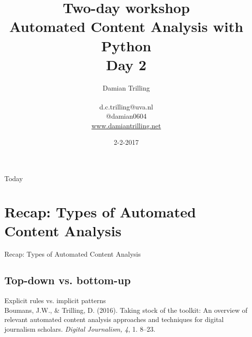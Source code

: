 \documentclass[handout]{beamer}
\begin{document}
\title[Automated Content Analysis with Python]{\textbf{Two-day workshop\\ Automated Content Analysis with Python} \\ Day 2}
\author[Damian Trilling]{Damian Trilling \\ ~ \\ \footnotesize{d.c.trilling@uva.nl \\@damian0604} \\ \url{www.damiantrilling.net}}
\date{2-2-2017}


\begin{frame}{}
\titlepage
\end{frame}

\begin{frame}{Today}
\tableofcontents
\end{frame}




\section[Recap]{Recap: Types of Automated Content Analysis}
\begin{frame}{}
Recap: Types of Automated Content Analysis
\end{frame}
\subsection*{Top-down vs. bottom-up}





\begin{frame}{Explicit rules vs. implicit patterns}
	\\
	\tiny
	Boumans, J.W., \& Trilling, D. (2016). Taking stock of the toolkit: An overview of relevant automated content analysis approaches and techniques for digital journalism scholars. \emph{Digital Journalism, 4}, 1. 8--23.
\end{frame}
\end{document}
